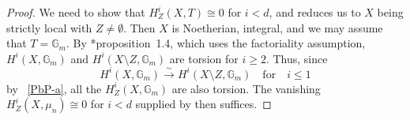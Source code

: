 \documentclass[11pt, reqno]{amsart}
\newcommand{\bG}{\mathbb{G}}
\newcommand{\isomto}{\overset{\sim}{\longrightarrow}}
\providecommand{\qxq}[1]{\quad\text{#1}\quad}
\newcommand{\bpf}{\begin{proof}}
\newcommand{\epf}{\end{proof}}
\numberwithin{equation}{numberingbase}
\theoremstyle{thms}
\theoremstyle{claims}
\theoremstyle{defs}
\theoremstyle{thms}
\theoremstyle{defs}
\theoremstyle{subsection-tweak}
\theoremstyle{subsection-tweak}
\begin{document}
\bpf
We need to show that $H^i_Z(X, T) \cong 0$ for $i < d$, and  reduces us to $X$ being strictly local with $Z \neq \emptyset$. %
Then $X$ is Noetherian, integral, and we may assume that $T = \bG_m$. By \cite{Gro68b}*{proposition~1.4}, which uses the factoriality assumption, $H^i(X, \bG_m)$ and $H^i(X\setminus Z, \bG_m)$ are torsion for $i \ge 2$. Thus, since 
\[
H^i(X, \bG_m) \isomto H^i(X\setminus Z, \bG_m) \qxq{for} i \le 1
\]
by ~\ref{PbP-a}, all the $H^{i}_Z(X, \bG_m)$ are also torsion. The vanishing $H^i_Z(X, \mu_n) \cong 0$ for $i < d$ supplied by  then suffices.
\epf







































%




 

\begin{bibdiv}
\begin{biblist}


\end{biblist}
\end{bibdiv}
\end{document}
